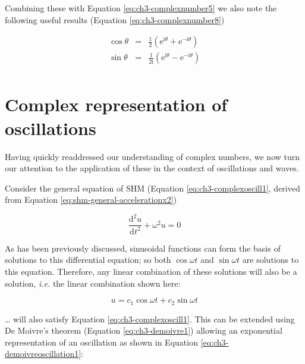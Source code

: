 \documentclass[
]{book}
\begin{document}
Combining these with Equation \eqref{eq:ch3-complexnumber5} we also note the following useful results (Equation \eqref{eq:ch3-complexnumber8})

\begin{equation}
\begin{array}{rcl}
\cos \theta &=& \frac{1}{2} \left( \mathrm{e}^{\mathrm{i}\theta} + \mathrm{e}^{-\mathrm{i}\theta} \right)\\
\sin \theta &=& \frac{1}{2\mathrm{i}} \left( \mathrm{e}^{\mathrm{i}\theta} - \mathrm{e}^{-\mathrm{i}\theta} \right)\\
\end{array}
\label{eq:ch3-complexnumber8}
\end{equation}

\hypertarget{sec:ch3-complexreposcillation}{%
\section{Complex representation of oscillations}\label{sec:ch3-complexreposcillation}}

Having quickly readdressed our understanding of complex numbers, we now turn our attention to the application of these in the context of oscillations and waves.

Consider the general equation of SHM (Equation \eqref{eq:ch3-complexoscill1}, derived from Equation \eqref{eq:shm-general-accelerationx2})

\begin{equation}
\frac{\mathrm{d}^2 u}{\mathrm{d} t^2 } + \omega^2 u = 0
\label{eq:ch3-complexoscill1}
\end{equation}

As has been previously discussed, sinusoidal functions can form the basis of solutions to this differential equation; so both \(\cos \omega t\) and \(\sin \omega t\) are solutions to this equation. Therefore, any linear combination of these solutions will also be a solution, \emph{i.e.} the linear combination shown here:

\begin{equation}
u = c_1 \cos \omega t + c_2 \sin \omega t
\end{equation}

\ldots{} will also satisfy Equation \eqref{eq:ch3-complexoscill1}. This can be extended using De Moivre's theorem (Equation \eqref{eq:ch3-demoivre1}) allowing an exponential representation of an oscillation as shown in Equation \eqref{eq:ch3-demoivreoscillation1}:
\end{document}
